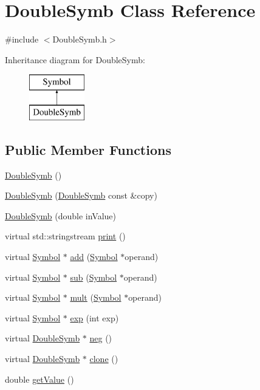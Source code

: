 \hypertarget{class_double_symb}{\section{Double\+Symb Class Reference}
\label{class_double_symb}
}


{\ttfamily \#include $<$Double\+Symb.\+h$>$}

Inheritance diagram for Double\+Symb\+:\begin{figure}[H]
\begin{center}
\leavevmode
\includegraphics[height=2.000000cm]{class_double_symb}
\end{center}
\end{figure}
\subsection*{Public Member Functions}
\begin{DoxyCompactItemize}
\item 
\hyperlink{class_double_symb_aa338df568f038fb85fbdeefe33488ffd}{Double\+Symb} ()
\item 
\hyperlink{class_double_symb_ae7cb2e3ecc7bac207a9dba3ae0886317}{Double\+Symb} (\hyperlink{class_double_symb}{Double\+Symb} const \&copy)
\item 
\hyperlink{class_double_symb_a67806283db4e2c356654ceef7a91afcb}{Double\+Symb} (double in\+Value)
\item 
virtual std\+::stringstream \hyperlink{class_double_symb_a6bb7ecda5dfda94ecb658733eafc2f38}{print} ()
\item 
virtual \hyperlink{class_symbol}{Symbol} $\ast$ \hyperlink{class_double_symb_a1d8cca63cce9963b43030891f1ff5e48}{add} (\hyperlink{class_symbol}{Symbol} $\ast$operand)
\item 
virtual \hyperlink{class_symbol}{Symbol} $\ast$ \hyperlink{class_double_symb_a0c08d8436a47c3d9e96d19aa80a2bab9}{sub} (\hyperlink{class_symbol}{Symbol} $\ast$operand)
\item 
virtual \hyperlink{class_symbol}{Symbol} $\ast$ \hyperlink{class_double_symb_a7b297714a165576a11ab7ba6b8990f0a}{mult} (\hyperlink{class_symbol}{Symbol} $\ast$operand)
\item 
virtual \hyperlink{class_symbol}{Symbol} $\ast$ \hyperlink{class_double_symb_a3b632822ad185fce623724148c914b8c}{exp} (int exp)
\item 
virtual \hyperlink{class_double_symb}{Double\+Symb} $\ast$ \hyperlink{class_double_symb_a36170febbfcd8709841050db05e6415b}{neg} ()
\item 
virtual \hyperlink{class_double_symb}{Double\+Symb} $\ast$ \hyperlink{class_double_symb_a69077ea0fe3ed9eae80e3710e4be84e2}{clone} ()
\item 
double \hyperlink{class_double_symb_a4d28f9c21ace82744a042a02a7b9728c}{get\+Value} ()
\end{DoxyCompactItemize}
